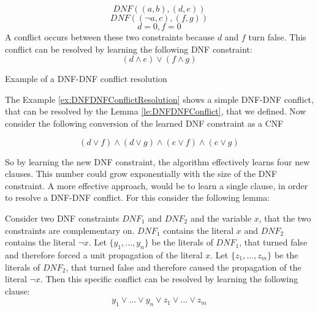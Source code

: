 \begin{example}
\begin{leftbar}
\begin{displaymath}
DNF((a,b),(d,e))
\end{displaymath}
\begin{displaymath}
DNF((\neg a, c),(f,g))
\end{displaymath}
\begin{displaymath}
d = 0, f = 0
\end{displaymath}
A conflict occurs between these two constraints because $d$ and $f$ turn false. This conflict can be resolved by learning the following DNF constraint:
\begin{displaymath}
(d \wedge e) \vee (f \wedge g)
\end{displaymath}
\end{leftbar}
\caption{Example of a DNF-DNF conflict resolution}
\label{ex:DNFDNFConflictResolution}
\end{example}

The Example \ref{ex:DNFDNFConflictResolution} shows a simple DNF-DNF conflict, that can be resolved by the Lemma \ref{le:DNFDNFConflict}, that we defined. Now consider the following conversion of the learned DNF constraint as a CNF

\begin{leftbar}
\begin{displaymath}
(d \vee f) \wedge (d \vee g) \wedge (e \vee f) \wedge (e \vee g)
\end{displaymath}
\end{leftbar}

So by learning the new DNF constraint, the algorithm effectively learns four new clauses. This number could grow exponentially with the size of the DNF constraint. A more effective approach, would be to learn a single clause, in order to resolve a DNF-DNF conflict. For this consider the following lemma:

\begin{lemma}
\begin{leftbar}
Consider two DNF constraints $DNF_1$ and $DNF_2$ and the variable $x$, that the two constraints are complementary on. $DNF_1$ contains the literal $x$ and $DNF_2$ contains the literal $\neg x$. Let $\{y_1,...,y_n\}$ be the literals of $DNF_1$, that turned false and therefore forced a unit propagation of the literal $x$. Let $\{z_1,...,z_m\}$ be the literals of $DNF_2$, that turned false and therefore caused the propagation of the literal $\neg x$. Then this specific conflict can be resolved by learning the following clause:
\begin{displaymath}
y_1 \vee ... \vee y_n \vee z_1 \vee ... \vee z_m
\end{displaymath}
\end{leftbar}
\label{le:DNFDNFConflictAlt}
\end{lemma}

